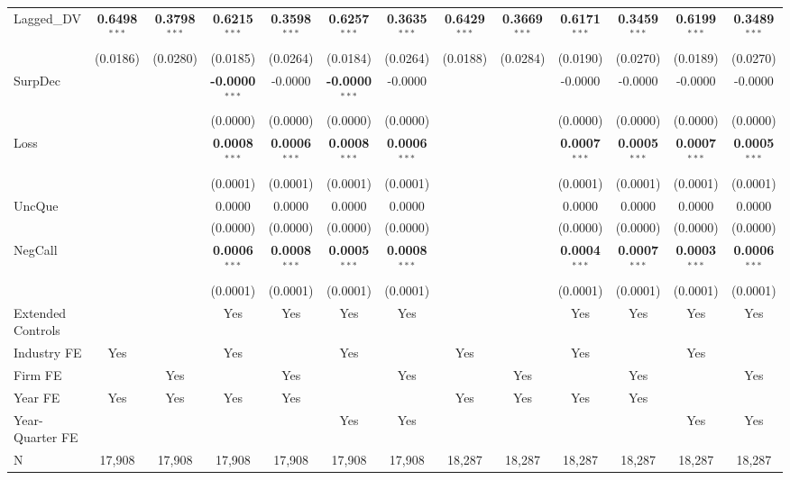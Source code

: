 \begin{landscape}
\begin{table}[H]
\begin{tabular}{lcccccccccccc}
Lagged\_DV & \textbf{0.6498}$^{***}$ & \textbf{0.3798}$^{***}$ & \textbf{0.6215}$^{***}$ & \textbf{0.3598}$^{***}$ & \textbf{0.6257}$^{***}$ & \textbf{0.3635}$^{***}$ & \textbf{0.6429}$^{***}$ & \textbf{0.3669}$^{***}$ & \textbf{0.6171}$^{***}$ & \textbf{0.3459}$^{***}$ & \textbf{0.6199}$^{***}$ & \textbf{0.3489}$^{***}$ \\
 & (0.0186) & (0.0280) & (0.0185) & (0.0264) & (0.0184) & (0.0264) & (0.0188) & (0.0284) & (0.0190) & (0.0270) & (0.0189) & (0.0270) \\
SurpDec &  &  & \textbf{-0.0000}$^{***}$ & -0.0000 & \textbf{-0.0000}$^{***}$ & -0.0000 &  &  & -0.0000 & -0.0000 & -0.0000 & -0.0000 \\
 &  &  & (0.0000) & (0.0000) & (0.0000) & (0.0000) &  &  & (0.0000) & (0.0000) & (0.0000) & (0.0000) \\
Loss &  &  & \textbf{0.0008}$^{***}$ & \textbf{0.0006}$^{***}$ & \textbf{0.0008}$^{***}$ & \textbf{0.0006}$^{***}$ &  &  & \textbf{0.0007}$^{***}$ & \textbf{0.0005}$^{***}$ & \textbf{0.0007}$^{***}$ & \textbf{0.0005}$^{***}$ \\
 &  &  & (0.0001) & (0.0001) & (0.0001) & (0.0001) &  &  & (0.0001) & (0.0001) & (0.0001) & (0.0001) \\
UncQue &  &  & 0.0000 & 0.0000 & 0.0000 & 0.0000 &  &  & 0.0000 & 0.0000 & 0.0000 & 0.0000 \\
 &  &  & (0.0000) & (0.0000) & (0.0000) & (0.0000) &  &  & (0.0000) & (0.0000) & (0.0000) & (0.0000) \\
NegCall &  &  & \textbf{0.0006}$^{***}$ & \textbf{0.0008}$^{***}$ & \textbf{0.0005}$^{***}$ & \textbf{0.0008}$^{***}$ &  &  & \textbf{0.0004}$^{***}$ & \textbf{0.0007}$^{***}$ & \textbf{0.0003}$^{***}$ & \textbf{0.0006}$^{***}$ \\
 &  &  & (0.0001) & (0.0001) & (0.0001) & (0.0001) &  &  & (0.0001) & (0.0001) & (0.0001) & (0.0001) \\
\midrule
Extended Controls &  &  & Yes & Yes & Yes & Yes &  &  & Yes & Yes & Yes & Yes \\
Industry FE & Yes &  & Yes &  & Yes &  & Yes &  & Yes &  & Yes &  \\
Firm FE &  & Yes &  & Yes &  & Yes &  & Yes &  & Yes &  & Yes \\
Year FE & Yes & Yes & Yes & Yes &  &  & Yes & Yes & Yes & Yes &  &  \\
Year-Quarter FE &  &  &  &  & Yes & Yes &  &  &  &  & Yes & Yes \\
\midrule
N & 17,908 & 17,908 & 17,908 & 17,908 & 17,908 & 17,908 & 18,287 & 18,287 & 18,287 & 18,287 & 18,287 & 18,287 \\

\end{tabular}
\end{table}
\end{landscape}
